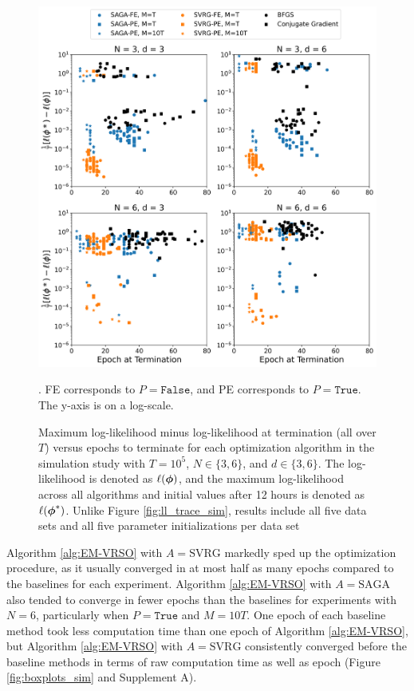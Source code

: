 \begin{figure}%
    \centering
    \includegraphics[width=5.5in]{../plt/scatter_sim_T_100000_epoch.png}
    \caption{Maximum log-likelihood minus log-likelihood at termination (all over $T$) versus epochs to terminate for each optimization algorithm in the simulation study with $T=10^{5}$, $N \in \{3,6\}$, and $d \in \{3,6\}$. The log-likelihood is denoted as $\ell(\boldsymbol{\phi})$, and the maximum log-likelihood across all algorithms and initial values after 12 hours is denoted as $\ell(\boldsymbol{\phi}^*)$. Unlike Figure \ref{fig:ll_trace_sim}, results include all five data sets and all five parameter initializations per data set}. FE corresponds to $P = \texttt{False}$, and PE corresponds to $P = \texttt{True}$. The y-axis is on a log-scale.
    \label{fig:scatter_sim}
\end{figure}
%
Algorithm \ref{alg:EM-VRSO} with $A=\text{SVRG}$ markedly sped up the optimization procedure, as it usually converged in at most half as many epochs compared to the baselines for each experiment. Algorithm \ref{alg:EM-VRSO} with $A=\text{SAGA}$ also tended to converge in fewer epochs than the baselines for experiments with $N=6$, particularly when $P = \texttt{True}$ and $M=10T$. One epoch of each baseline method took less computation time than one epoch of Algorithm \ref{alg:EM-VRSO}, but Algorithm \ref{alg:EM-VRSO} with $A=\text{SVRG}$ consistently converged before the baseline methods in terms of raw computation time as well as epoch (Figure \ref{fig:boxplots_sim} and Supplement A).
